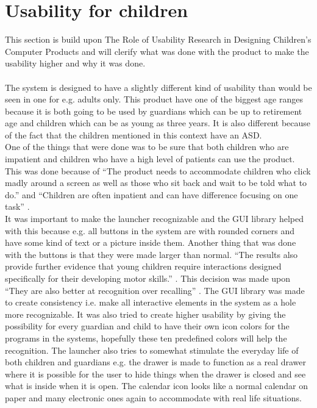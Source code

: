 \section{Usability for children}
\label{Preanalysis:Usability_for_children}
This section is build upon The Role of Usability Research in Designing Children's Computer Products and will clerify what was done with the product to make the usability higher and why it was done.\\\\
The \giraf[] system is designed to have a slightly different kind of usability than would be seen in one for e.g. adults only. This product have one of the biggest age ranges because it is both going to be used by guardians which can be up to retirement age and children which can be as young as three years. It is also different because of the fact that the children mentioned in this context have an ASD.\\
One of the things that were done was to be sure that both children who are impatient and children who have a high level of patients can use the product. This was done because of ``The product needs to accommodate children who click madly around a screen as well as those who sit back and wait to be told what to do.'' \citep{microsoft:usability} and ``Children are often inpatient and can have difference focusing on one task'' \citep{microsoft:usability}.\\
It was important to make the launcher recognizable and the \giraf[] GUI library helped with this because e.g. all buttons in the \giraf[] system are with rounded corners and have some kind of text or a picture inside them. Another thing that was done with the buttons is that they were made larger than normal. ``The results also provide further evidence that young children require interactions designed specifically for their developing motor skills.'' \citep[p. 8]{mousesize}.
This decision was made upon ``They are also better at recognition over recalling'' \citep{microsoft:usability}. The \giraf[] GUI library was made to create consistency i.e. make all interactive elements in the \giraf[] system as a hole more recognizable. It was also tried to create higher usability by giving the possibility for every guardian and child to have their own icon colors for the programs in the \giraf[] systems, hopefully these ten predefined colors will help the recognition. The launcher also tries to somewhat stimulate the everyday life of both children and guardians e.g. the drawer is made to function as a real drawer where it is possible for the user to hide things when the drawer is closed and see what is inside when it is open. The calendar icon looks like a normal calendar on paper and many electronic ones again to accommodate with real life situations. 
